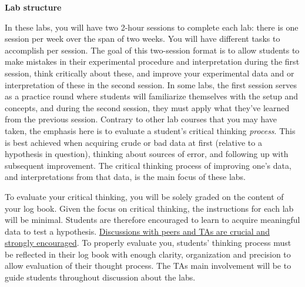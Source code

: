 \documentclass[12pt]{report}
\begin{document}

\noindent \large \textbf{Lab structure} \normalsize

In these labs, you will have two 2-hour sessions to complete each lab: there is one session per week over the span of two weeks. 
You will have different tasks to accomplish per session. The goal of this two-session format is to allow students to make mistakes in their experimental procedure and interpretation during the first session, think critically about these, and improve your experimental data and or interpretation of these in the second session. 
In some labs, the first session serves as a practice round where students will familiarize themselves with the setup and concepts, and during the second session, they must apply what they've learned from the previous session.
Contrary to other lab courses that you may have taken, the emphasis here is to evaluate a student's critical thinking \textit{process}. This is best achieved when acquiring crude or bad data at first (relative to a hypothesis  in question), thinking about sources of error, and following up with subsequent improvement. 
The critical thinking process of improving one's data, and interpretations from that data, is the main focus of these labs.

To evaluate your critical thinking, you will be solely graded on the content of your log book.
Given the focus on critical thinking, the instructions for each lab will be minimal. 
Students are therefore encouraged to learn to acquire meaningful data to test a hypothesis. \underline{Discussions with peers and TAs are crucial and} \underline{strongly encouraged}. 
To properly evaluate you, students' thinking process must  be reflected in their log book with enough clarity, organization and precision to allow  evaluation of their thought process. The TAs main involvement will be to guide students throughout discussion about the labs. 
\end{document}
